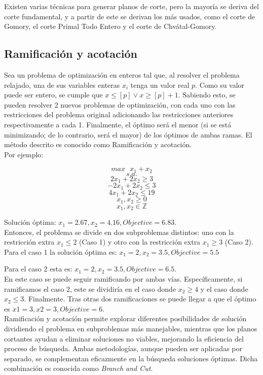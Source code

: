 \documentclass[12pt]{report}
\begin{document}
Existen varias técnicas para generar planos de corte, pero la mayoría se deriva del corte fundamental, y a partir de este se derivan los más usados, como el corte de Gomory, el corte Primal Todo Entero y el corte  de Chvátal-Gomory.\\


\subsection{Ramificación y acotación\\}

Sea un problema de optimización en enteros tal que, al resolver el problema relajado, una de sus variables enteras $x_i$ tenga un valor real $p$. Como su valor puede ser entero, se cumple que $x \leq  [p] \lor  x \geq  [p]+1$. Sabiendo esto, se pueden resolver 2 nuevos problemas de optimización, con cada uno con las restricciones del problema original adicionando las restricciones anteriores respectivamente a cada 1. Finalmente, el óptimo será el menor (si se está minimizando; de lo contrario, será el mayor) de los óptimos de ambas ramas. El método descrito es conocido como Ramificación y acotación. \\

Por ejemplo:

$$max \text{ } x_1 + x_2$$
$$s.a.$$
$$2x_1 + 2x_2 \geq  3$$
$$-2x_1 + 2x_2 \leq  3$$
$$4x_1 + 2x_2 \leq  19$$
$$x_1, x_2 \geq  0$$
$$x_1, x_2 \in \mathbb{Z}$$

Solución óptima: $x_1=2.67, x_2=4.16, Objective=6.83$.\\

Entonces, el problema se divide en dos subproblemas distintos: uno con la restricción extra $x_1\leq 2$ (Caso 1) y otro con la restricción extra $x_1\geq 3$ (Caso 2).\\

Para el caso 1 la solución óptima es: $x_1=2, x_2=3.5, Objective=5.5$

Para el caso 2 esta es: $x_1=2, x_2=3.5, Objective=6.5$.\\

En este caso se puede seguir ramificando por ambas vías. Específicamente, si ramificamos el caso 2, este se dividiría en el caso donde $x_2\geq 4$ y el caso donde $x_2\leq 3$. Finalmente. Tras otras dos ramificaciones se puede llegar a que el óptimo es $x1=3, x2=3, Objective=6$.\\

Ramificación y acotación permite explorar diferentes posibilidades de solución dividiendo el problema en subproblemas más manejables, mientras que los planos cortantes ayudan a eliminar soluciones no viables, mejorando la eficiencia del proceso de búsqueda. Ambas metodologías, aunque pueden ser aplicadas por separado, se complementan eficazmente en la búsqueda soluciones óptimas. Dicha combinación es conocida como \textit{Branch and Cut}. 
\end{document}
